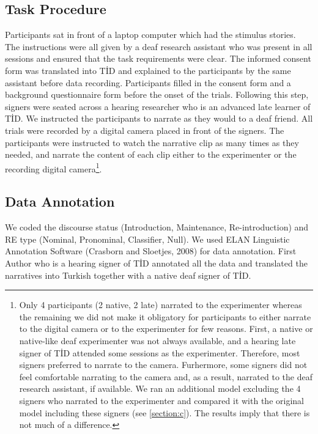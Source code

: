 \documentclass[]{elsarticle} %
\begin{document}
\hypertarget{task-procedure}{%
\subsection{Task Procedure}\label{task-procedure}}

Participants sat in front of a laptop computer which had the stimulus
stories. The instructions were all given by a deaf research assistant
who was present in all sessions and ensured that the task requirements
were clear. The informed consent form was translated into TİD and
explained to the participants by the same assistant before data
recording. Participants filled in the consent form and a background
questionnaire form before the onset of the trials. Following this step,
signers were seated across a hearing researcher who is an advanced late
learner of TİD. We instructed the participants to narrate as they would
to a deaf friend. All trials were recorded by a digital camera placed in
front of the signers. The participants were instructed to watch the
narrative clip as many times as they needed, and narrate the content of
each clip either to the experimenter or the recording digital
camera\footnote{Only 4 participants (2 native, 2 late) narrated to the experimenter whereas the remaining we did not make it obligatory for participants to either narrate to the digital camera or to the experimenter for few reasons. First, a native or native-like deaf experimenter was not always available, and a hearing late signer of TİD attended some sessions as the experimenter. Therefore, most signers preferred to narrate to the camera. Furhermore, some signers did not feel comfortable narrating to the camera and, as a result, narrated to the deaf research assistant, if available. We ran an additional model excluding the 4 signers who narrated to the experimenter and compared it with the original model including these signers (see \ref{section:c}). The results imply that there is not much of a difference.}.

\hypertarget{data-annotation}{%
\subsection{Data Annotation}\label{data-annotation}}

We coded the discourse status (Introduction, Maintenance,
Re-introduction) and RE type (Nominal, Pronominal, Classifier, Null). We
used ELAN Linguistic Annotation Software (Crasborn and Sloetjes, 2008)
for data annotation. First Author who is a hearing signer of TİD
annotated all the data and translated the narratives into Turkish
together with a native deaf signer of TİD.
\end{document}
